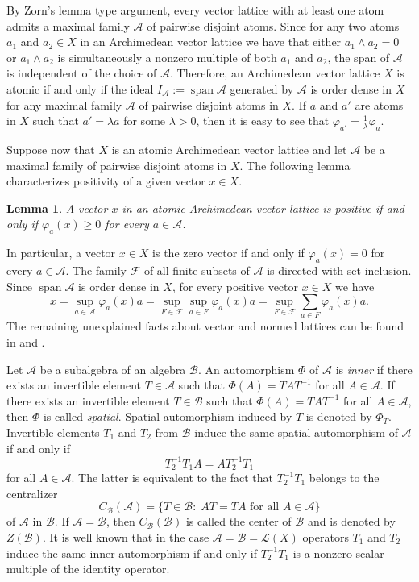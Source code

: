 \documentclass[12pt,reqno]{amsart}
\theoremstyle{plain}
\newtheorem{lemma}[theorem]{Lemma}
\theoremstyle{definition}
\DeclareMathOperator{\Span}{span}
\begin{document}
By Zorn's lemma type argument, every  vector lattice with at least one atom admits a maximal family $\mathcal A$ of pairwise disjoint atoms. Since for any two atoms $a_1$ and $a_2\in X$ in an Archimedean vector lattice we have that either $a_1\wedge a_2=0$ or $a_1\wedge a_2$ is simultaneously a nonzero multiple of both $a_1$ and $a_2$, the span of $\mathcal A$ is independent of the choice of $\mathcal A$. 
Therefore, an Archimedean vector lattice $X$ is atomic if and only if the ideal $I_{\mathcal A}:=\Span \mathcal A$ generated by $\mathcal A$ is order dense in $X$ for any maximal family $\mathcal A$ of pairwise disjoint atoms in $X$. If $a$ and $a'$ are  atoms in $X$ such that $a'=\lambda a$ for some $\lambda>0$, then it is easy to see that $\varphi_{a'}=\frac{1}{\lambda}\varphi_a$. 
 
Suppose now that $X$ is an atomic Archimedean vector lattice and let $\mathcal A$ be a maximal family of pairwise disjoint atoms in $X$. The following lemma characterizes positivity of a given vector $x\in X$. 

\begin{lemma}\label{pozfia je poz}
    A vector $x$ in an atomic Archimedean vector lattice is positive if and only if $\varphi_a(x)\geq 0$ for every $a\in \mathcal A$. 
\end{lemma}

In particular, a vector $x\in X$ is the zero vector if and only if $\varphi_a(x)=0$ for every $a\in \mathcal A$. The family $\mathcal F$ of all finite subsets of $\mathcal A$ is directed with set inclusion. Since  $\Span \mathcal A$ is order dense in $X$, for every positive vector $x\in X$ we have
\begin{equation}\label{zapis z atomi}
x=\sup_{a\in \mathcal A}\varphi_a(x)a=\sup_{F\in \mathcal F}\sup_{a\in F}\varphi_a(x)a=\sup_{F\in \mathcal F}\sum_{a\in F}\varphi_a(x)a. 
\end{equation}
The remaining unexplained facts about vector and normed lattices can be found in \cite{Aliprantis:06} and \cite{LZ71}.

Let $\mathscr A$ be a subalgebra of an algebra $\mathscr B$. An automorphism $\Phi$ of $\mathscr A$ is \emph{inner} if there exists an invertible element $T\in \mathscr A$ such that $\Phi(A)=TAT^{-1}$ for all $A\in \mathscr A$. If there exists an invertible element $T\in \mathscr B$ such that $\Phi(A)=TAT^{-1}$ for all $A\in \mathscr A$, then $\Phi$ is called \emph{spatial}. Spatial automorphism induced by $T$ is denoted by $\Phi_T$. Invertible elements $T_1$ and $T_2$ from $\mathscr B$ induce the same spatial automorphism of $\mathscr A$ if and only if  
$$T_2^{-1}T_1A=AT_2^{-1}T_1$$ for all $A\in \mathscr A$. The latter is equivalent to the fact that $T_2^{-1}T_1$ belongs to the centralizer 
$$C_{\mathscr B}(\mathscr A)=\{T\in \mathscr B:\; AT=TA \textrm{ for all } A\in \mathscr A\}$$
of $\mathscr A$ in $\mathscr B$.
If $\mathscr A=\mathscr B$, then $C_{\mathscr B}(\mathscr B)$ is called the center of $\mathscr B$ and is denoted by $Z(\mathscr B)$.
 It is well known that in the case  $\mathscr A=\mathscr B=\mathscr L(X)$ operators $T_1$ and $T_2$ induce the same inner automorphism if and only if $T_2^{-1}T_1$ is a nonzero scalar multiple of the identity operator. 
\end{document}
